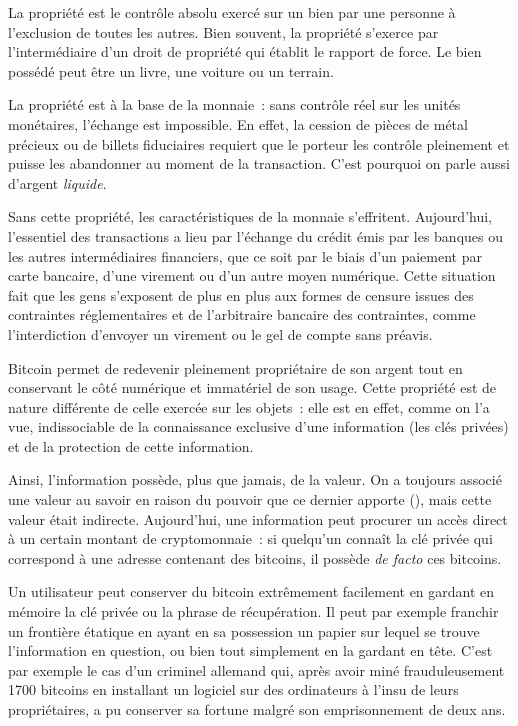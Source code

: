 La propriété est le contrôle absolu exercé sur un bien par une personne à l'exclusion de toutes les autres. Bien souvent, la propriété s'exerce par l'intermédiaire d'un droit de propriété qui établit  le rapport de force. Le bien possédé peut être un livre, une voiture ou un terrain. %

La propriété est à la base de la monnaie~: sans contrôle réel sur les unités monétaires, l'échange est impossible. En effet, la cession de pièces de métal précieux ou de billets fiduciaires requiert que le porteur les contrôle pleinement et puisse les abandonner au moment de la transaction. C'est pourquoi on parle aussi d'argent \emph{liquide}.

Sans cette propriété, les caractéristiques de la monnaie s'effritent. Aujourd'hui, l'essentiel des transactions a lieu par l'échange du crédit émis par les banques ou les autres intermédiaires financiers, que ce soit par le biais d'un paiement par carte bancaire, d'une virement ou d'un autre moyen numérique. Cette situation fait que les gens s'exposent de plus en plus aux formes de censure issues des contraintes réglementaires et de l'arbitraire bancaire des contraintes, comme l'interdiction d'envoyer un virement ou le gel de compte sans préavis.

Bitcoin permet de redevenir pleinement propriétaire de son argent tout en conservant le côté numérique et immatériel de son usage. Cette propriété est de nature différente de celle exercée sur les objets~: elle est en effet, comme on l'a vue, indissociable de la connaissance exclusive d'une information (les clés privées) et de la protection de cette information.

Ainsi, l'information possède, plus que jamais, de la valeur. On a toujours associé une valeur au savoir en raison du pouvoir que ce dernier apporte (), mais cette valeur était indirecte. Aujourd'hui, une information peut procurer un accès direct à un certain montant de cryptomonnaie~: si quelqu'un connaît la clé privée qui correspond à une adresse contenant des bitcoins, il possède \emph{de facto} ces bitcoins.

Un utilisateur peut conserver du bitcoin extrêmement facilement en gardant en mémoire la clé privée ou la phrase de récupération. Il peut par exemple franchir un frontière étatique en ayant en sa possession un papier sur lequel se trouve l'information en question, ou bien tout simplement en la gardant en tête. C'est par exemple le cas d'un criminel allemand qui, après avoir miné frauduleusement 1700 bitcoins en installant un logiciel sur des ordinateurs à l'insu de leurs propriétaires, a pu conserver sa fortune malgré son emprisonnement de deux ans.

